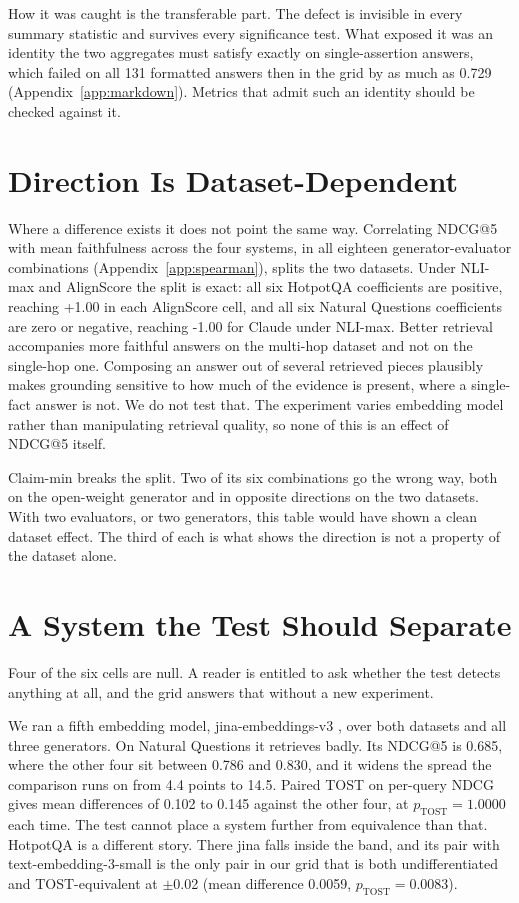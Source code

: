 \documentclass[11pt]{article}
\begin{document}
How it was caught is the transferable part. The defect is invisible in every summary statistic and survives every significance test. What exposed it was an identity the two aggregates must satisfy exactly on single-assertion answers, which failed on all 131 formatted answers then in the grid by as much as 0.729 (Appendix~\ref{app:markdown}). Metrics that admit such an identity should be checked against it.

\section{Direction Is Dataset-Dependent}
\label{sec:direction}

Where a difference exists it does not point the same way. Correlating NDCG@5 with mean faithfulness across the four systems, in all eighteen generator-evaluator combinations (Appendix~\ref{app:spearman}), splits the two datasets. Under NLI-max and AlignScore the split is exact: all six HotpotQA coefficients are positive, reaching +1.00 in each AlignScore cell, and all six Natural Questions coefficients are zero or negative, reaching -1.00 for Claude under NLI-max. Better retrieval accompanies more faithful answers on the multi-hop dataset and not on the single-hop one. Composing an answer out of several retrieved pieces plausibly makes grounding sensitive to how much of the evidence is present, where a single-fact answer is not. We do not test that. The experiment varies embedding model rather than manipulating retrieval quality, so none of this is an effect of NDCG@5 itself.

Claim-min breaks the split. Two of its six combinations go the wrong way, both on the open-weight generator and in opposite directions on the two datasets. With two evaluators, or two generators, this table would have shown a clean dataset effect. The third of each is what shows the direction is not a property of the dataset alone.

\section{A System the Test Should Separate}
\label{sec:control}

Four of the six cells are null. A reader is entitled to ask whether the test detects anything at all, and the grid answers that without a new experiment.

We ran a fifth embedding model, jina-embeddings-v3 \citep{sturua-etal-2024}, over both datasets and all three generators. On Natural Questions it retrieves badly. Its NDCG@5 is 0.685, where the other four sit between 0.786 and 0.830, and it widens the spread the comparison runs on from 4.4 points to 14.5. Paired TOST on per-query NDCG gives mean differences of 0.102 to 0.145 against the other four, at $p_{\mathrm{TOST}} = 1.0000$ each time. The test cannot place a system further from equivalence than that. HotpotQA is a different story. There jina falls inside the band, and its pair with text-embedding-3-small is the only pair in our grid that is both undifferentiated and TOST-equivalent at $\pm$0.02 (mean difference 0.0059, $p_{\mathrm{TOST}} = 0.0083$).
\end{document}
